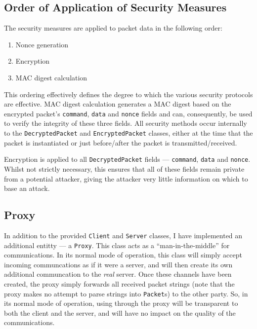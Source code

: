 \documentclass[a4paper,11pt]{article}
\begin{document}
\subsection{Order of Application of Security Measures}
The security measures are applied to packet data in the following order:
\begin{enumerate}
\item Nonce generation
\item Encryption
\item MAC digest calculation
\end{enumerate}

This ordering effectively defines the degree to which the various security 
protocols are effective. MAC digest calculation generates a MAC digest based on
the encrypted packet's \verb+command+, \verb+data+ and \verb+nonce+ fields and 
can, consequently, be used to verify the integrity of these three fields. All 
security methods occur internally to the \verb+DecryptedPacket+ and 
\verb+EncryptedPacket+ classes, either at the time that the packet is 
instantiated or just before/after the packet is transmitted/received.

Encryption is applied to all \verb+DecryptedPacket+ fields --- \verb+command+, 
\verb+data+ and \verb+nonce+. Whilst not strictly necessary, this ensures that 
all of these fields remain private from a potential attacker, giving the 
attacker very little information on which to base an attack. 

\subsection{Proxy}
In addition to the provided \serviceName{} \verb+Client+ and \verb+Server+ 
classes, I have implemented an additional \serviceName{} entitty --- a 
\serviceName{} \verb+Proxy+. This class acts as a ``man-in-the-middle'' for
\serviceName{} communications. In its normal mode of operation, this class will
simply accept incoming \serviceName{} communcations as if it were a 
\serviceName{} server, and will then create its own additional \serviceName{}
communcation to the \emph{real} \serviceName{} server. Once these channels have
been created, the proxy simply forwards all received packet strings (note that 
the proxy makes no attempt to parse strings into \verb+Packet+s) to the other
party. So, in its normal mode of operation, using \serviceName{} through the
proxy will be transparent to both the client and the server, and will have no
impact on the quality of the communications.
\end{document}
